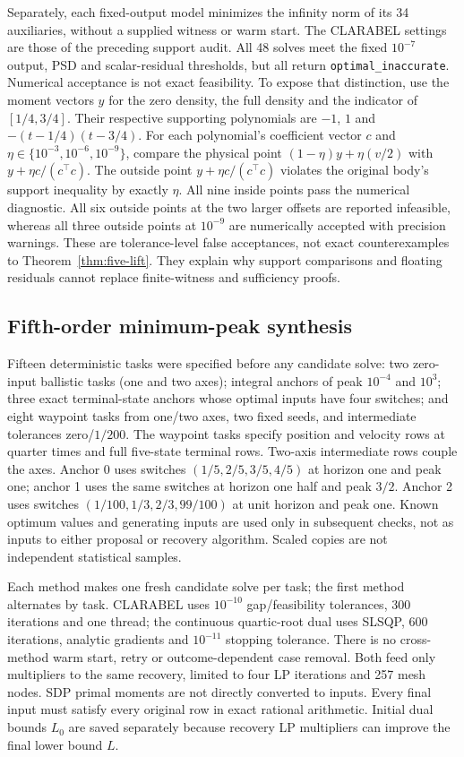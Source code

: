 \documentclass[pdflatex,sn-mathphys-num]{sn-jnl}
\theoremstyle{thmstyleone}
\theoremstyle{thmstyletwo}\newtheorem{remark}[theorem]{Remark}
\begin{document}
Separately, each fixed-output model minimizes the infinity norm of its 34
auxiliaries, without a supplied witness or warm start. The CLARABEL settings
are those of the preceding support audit. All 48 solves meet the fixed
$10^{-7}$ output, PSD and scalar-residual thresholds, but all return
\texttt{optimal\_inaccurate}. Numerical acceptance is not exact feasibility.
To expose that distinction, use the moment vectors $y$ for the zero density,
the full density and the indicator of $[1/4,3/4]$. Their respective supporting
polynomials are $-1$, $1$ and $-(t-1/4)(t-3/4)$. For each polynomial's
coefficient vector $c$ and
$\eta\in\{10^{-3},10^{-6},10^{-9}\}$, compare the physical point
$(1-\eta)y+\eta(v/2)$ with $y+\eta c/(c^\top c)$.
The outside point $y+\eta c/(c^\top c)$ violates the original body's
support inequality by exactly $\eta$.
All nine inside points pass the numerical diagnostic. All six outside points
at the two larger offsets are reported infeasible, whereas all three outside
points at $10^{-9}$ are numerically accepted with precision warnings.
These are tolerance-level false acceptances, not exact counterexamples to
Theorem~\ref{thm:five-lift}. They explain why support comparisons and floating
residuals cannot replace finite-witness and sufficiency proofs.


\subsection{Fifth-order minimum-peak synthesis}\label{sec:five-pilot}
Fifteen deterministic tasks were specified before any candidate solve: two
zero-input ballistic tasks (one and two axes); integral anchors of peak
$10^{-4}$ and $10^3$; three exact terminal-state anchors whose optimal inputs
have four switches; and eight waypoint tasks from one/two axes, two fixed
seeds, and intermediate tolerances zero/$1/200$. The waypoint tasks specify position
and velocity rows at quarter times and full five-state terminal rows.
Two-axis intermediate rows couple the axes. Anchor 0 uses switches
$(1/5,2/5,3/5,4/5)$ at horizon one and peak one; anchor 1 uses the same
switches at horizon one half and peak $3/2$. Anchor 2 uses switches
$(1/100,1/3,2/3,99/100)$ at unit horizon and peak one.
Known optimum values and generating inputs are used only in subsequent checks,
not as inputs to either proposal or recovery algorithm. Scaled copies are
not independent statistical samples.

Each method makes one fresh candidate solve per task; the first method
alternates by task. CLARABEL uses $10^{-10}$ gap/feasibility tolerances,
300 iterations and one thread; the continuous quartic-root dual uses SLSQP,
600 iterations, analytic gradients and $10^{-11}$ stopping tolerance.
There is no cross-method warm start, retry or outcome-dependent case removal.
Both feed only multipliers to the same recovery, limited to four LP iterations
and 257 mesh nodes. SDP primal moments are not directly converted to inputs.
Every final input must satisfy every original row in exact rational arithmetic.
Initial dual bounds $L_0$ are saved separately because recovery LP multipliers
can improve the final lower bound $L$.
\end{document}
